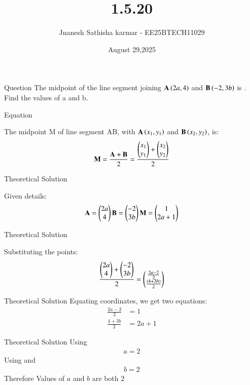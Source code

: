 \documentclass{beamer}
\title %
{1.5.20}
\date{August 29,2025}
\author 
{Jnanesh Sathisha karmar - EE25BTECH11029}
\begin{document}
\frame{\titlepage}
\begin{frame}{Question}
The midpoint of the line segment joining $\mathbf{A}\left(2a, 4\right)$ and $\mathbf{B}\left(-2, 3b\right)$ is . Find
the values of a and b.
\end{frame}



\begin{frame}{Equation}

The midpoint M of line segment AB, with $\mathbf{A}\left(x_1, y_1\right)$ and $\mathbf{B}\left(x_2, y_2\right)$, is:
\begin{align}
	\mathbf{M}=\frac{\mathbf{A}+\mathbf{B}}{2}=\frac{\begin{pmatrix}x_1\\y_1\end{pmatrix} + \begin{pmatrix}x_2\\y_2\end{pmatrix}}{2}
\end{align}

\end{frame}

\begin{frame}{Theoretical Solution}

Given details:
\begin{align}
    \mathbf{A}=\begin{pmatrix}2a\\4\end{pmatrix}  \mathbf{B}=\begin{pmatrix}-2\\3b\end{pmatrix} \mathbf{M}=\begin{pmatrix}1\\2a+1\end{pmatrix}
\end{align}
\end{frame}

\begin{frame}{Theoretical Solution}

Substituting the points:
\begin{align}
\frac{\begin{pmatrix}2a\\4\end{pmatrix} + \begin{pmatrix}-2\\3b\end{pmatrix}}{2}=\begin{pmatrix}\frac{2a-2}{2}\\ \frac{\left(4+3b\right)}{2}\end{pmatrix}
\end{align}

\end{frame}


\begin{frame}{Theoretical Solution}
Equating coordinates, we get two equations:
\begin{align}
\frac{2a - 2}{2} &= 1 \\
\frac{4 + 3b}{2} &= 2a + 1
\end{align}

\end{frame}
\begin{frame}{Theoretical Solution}
Using  
\begin{align}
    a=2
\end{align}
Using  and 
\begin{align}
    b=2
\end{align}
Therefore Values of $a$ and $b$ are both $2$
\end{frame}
\end{document}
